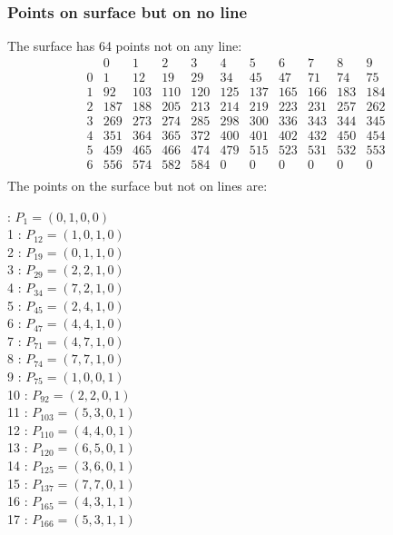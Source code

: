 \documentclass{article}
\begin{document}
{\subsubsection*{Points on surface but on no line}
The surface has 64 points not on any line:\\
$$
\begin{array}{r|*{10}{r}}
 & 0 & 1 & 2 & 3 & 4 & 5 & 6 & 7 & 8 & 9\\
\hline
0 & 1 & 12 & 19 & 29 & 34 & 45 & 47 & 71 & 74 & 75\\
1 & 92 & 103 & 110 & 120 & 125 & 137 & 165 & 166 & 183 & 184\\
2 & 187 & 188 & 205 & 213 & 214 & 219 & 223 & 231 & 257 & 262\\
3 & 269 & 273 & 274 & 285 & 298 & 300 & 336 & 343 & 344 & 345\\
4 & 351 & 364 & 365 & 372 & 400 & 401 & 402 & 432 & 450 & 454\\
5 & 459 & 465 & 466 & 474 & 479 & 515 & 523 & 531 & 532 & 553\\
6 & 556 & 574 & 582 & 584 & 0 & 0 & 0 & 0 & 0 & 0\\
\end{array}
$$
The points on the surface but not on lines are:\\
\begin{multicols}{2}
 : $P_{1}=( 0, 1, 0, 0 )$\\
1 : $P_{12}=( 1, 0, 1, 0 )$\\
2 : $P_{19}=( 0, 1, 1, 0 )$\\
3 : $P_{29}=( 2, 2, 1, 0 )$\\
4 : $P_{34}=( 7, 2, 1, 0 )$\\
5 : $P_{45}=( 2, 4, 1, 0 )$\\
6 : $P_{47}=( 4, 4, 1, 0 )$\\
7 : $P_{71}=( 4, 7, 1, 0 )$\\
8 : $P_{74}=( 7, 7, 1, 0 )$\\
9 : $P_{75}=( 1, 0, 0, 1 )$\\
10 : $P_{92}=( 2, 2, 0, 1 )$\\
11 : $P_{103}=( 5, 3, 0, 1 )$\\
12 : $P_{110}=( 4, 4, 0, 1 )$\\
13 : $P_{120}=( 6, 5, 0, 1 )$\\
14 : $P_{125}=( 3, 6, 0, 1 )$\\
15 : $P_{137}=( 7, 7, 0, 1 )$\\
16 : $P_{165}=( 4, 3, 1, 1 )$\\
17 : $P_{166}=( 5, 3, 1, 1 )$\\

\end{multicols}}
\end{document}
